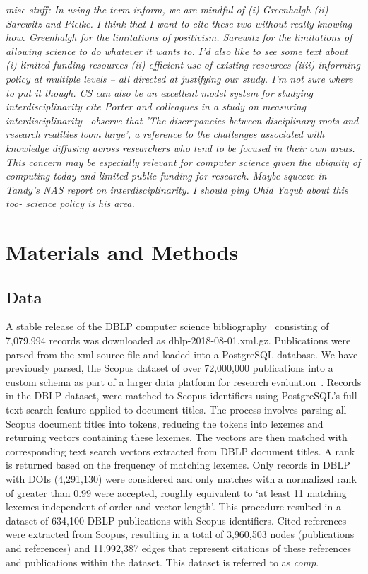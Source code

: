 \emph{misc stuff:  In using the term inform, we are mindful of (i) Greenhalgh (ii) Sarewitz and Pielke. I think that I want to cite these two without really knowing how. Greenhalgh for the limitations of positivism. Sarewitz for the limitations of allowing science to do whatever it wants to. I'd also like to see some text about (i) limited funding resources (ii) efficient use of existing resources (iiii) informing policy at multiple levels -- all directed at justifying our study. I'm not sure where to put it though. CS can also be an excellent model system for studying interdisciplinarity cite Porter and colleagues in a study on measuring interdisciplinarity~\cite{porter_measuring_2007} observe that 'The discrepancies between disciplinary roots and research realities loom large', a reference to the challenges associated with knowledge diffusing across researchers who tend to be focused in their own areas. This concern may be especially relevant for computer science given the ubiquity of computing today and limited public funding for research. Maybe squeeze in Tandy's NAS report on interdisciplinarity. I should ping Ohid Yaqub about this too- science policy is his area.}


\section{Materials and Methods}
\label{sec:methods}

\subsection{Data}
 A stable release of the DBLP computer science bibliography~\cite{dblp_ref} consisting of 7,079,994 records was downloaded as dblp-2018-08-01.xml.gz. Publications were parsed from the xml source file and loaded into a PostgreSQL database. We have previously parsed, the Scopus dataset of over 72,000,000 publications into a custom schema as part of a larger data platform for research evaluation~\cite{GithubERNIE2019}. Records in the DBLP dataset, were matched to Scopus identifiers using PostgreSQL's full text search feature applied to document titles. The process involves parsing all Scopus document titles into tokens, reducing the tokens into lexemes and returning vectors containing these lexemes. The vectors are then matched with corresponding text search vectors extracted from DBLP document titles. A rank is returned based on the frequency of matching lexemes. Only records in DBLP with DOIs (4,291,130) were considered and only matches with a normalized rank of greater than 0.99 were accepted, roughly equivalent to `at least 11 matching lexemes independent of order and vector length'. This procedure resulted in a dataset of 634,100 DBLP publications with Scopus identifiers. Cited references were extracted from Scopus, resulting in a total of 3,960,503 nodes (publications and references) and 11,992,387 edges that represent citations of these references and publications within the dataset. This dataset is referred to as \emph{comp}.\par

